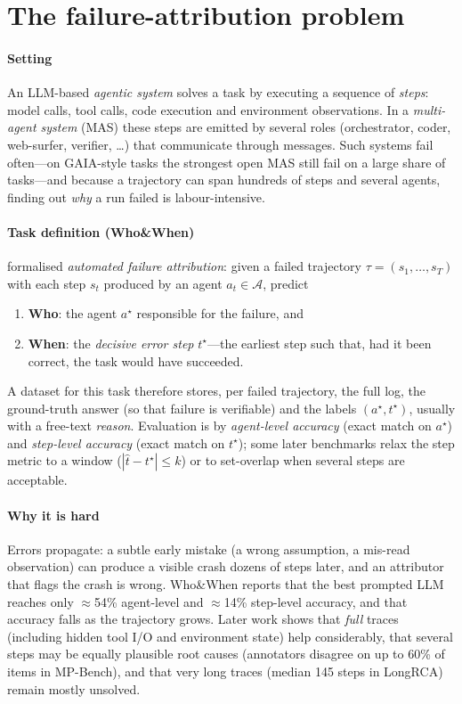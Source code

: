 \section{The failure-attribution problem}\label{sec:intro}

\paragraph{Setting} An LLM-based \emph{agentic system} solves a task by executing a sequence of \emph{steps}: model calls, tool calls, code execution and environment observations. In a \emph{multi-agent system} (MAS) these steps are emitted by several roles (orchestrator, coder, web-surfer, verifier, \dots) that communicate through messages. Such systems fail often---on GAIA-style tasks the strongest open MAS still fail on a large share of tasks---and because a trajectory can span hundreds of steps and several agents, finding out \emph{why} a run failed is labour-intensive.

\paragraph{Task definition (Who\&When)} \citet{zhang2025who} formalised \emph{automated failure attribution}: given a failed trajectory $\tau=(s_1,\dots,s_T)$ with each step $s_t$ produced by an agent $a_t\in\mathcal{A}$, predict
\begin{enumerate}
\item \textbf{Who}: the agent $a^\star$ responsible for the failure, and
\item \textbf{When}: the \emph{decisive error step} $t^\star$---the earliest step such that, had it been correct, the task would have succeeded.
\end{enumerate}
A dataset for this task therefore stores, per failed trajectory, the full log, the ground-truth answer (so that failure is verifiable) and the labels $(a^\star,t^\star)$, usually with a free-text \emph{reason}. Evaluation is by \emph{agent-level accuracy} (exact match on $a^\star$) and \emph{step-level accuracy} (exact match on $t^\star$); some later benchmarks relax the step metric to a window ($|{\hat t}-t^\star|\le k$) or to set-overlap when several steps are acceptable.

\paragraph{Why it is hard} Errors propagate: a subtle early mistake (a wrong assumption, a mis-read observation) can produce a visible crash dozens of steps later, and an attributor that flags the crash is wrong. Who\&When reports that the best prompted LLM reaches only $\approx$54\% agent-level and $\approx$14\% step-level accuracy, and that accuracy falls as the trajectory grows. Later work shows that \emph{full} traces (including hidden tool I/O and environment state) help considerably, that several steps may be equally plausible root causes (annotators disagree on up to 60\% of items in MP-Bench), and that very long traces (median 145 steps in LongRCA) remain mostly unsolved.

